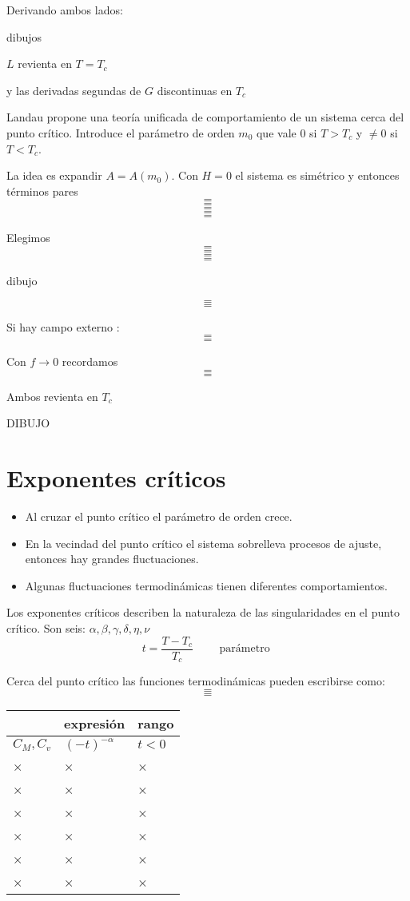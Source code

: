 \documentclass[10pt,oneside]{CBFT_book}
\begin{document}
Derivando ambos lados:

dibujos

$L$ revienta en $T=T_c$

y las derivadas segundas de $G$ discontinuas en $T_c$

Landau propone una teoría unificada de comportamiento de un sistema cerca del punto crítico.
Introduce el parámetro de orden $m_0$ que vale 0 si $T>T_c$ y $\neq 0$ si $T<T_c$.

La idea es expandir $ A = A(m_0) $.
Con $H=0$ el sistema es simétrico y entonces términos pares
\[=\]
\[=\]
\[=\]
\[=\]
\[=\]

Elegimos
\[=\]
\[=\]
\[=\]
\[=\]

dibujo

\[=\]
\[=\]

Si hay campo externo :
\[=\]
\[=\]

Con $f \to 0$ recordamos
\[=\]
\[=\]

Ambos revienta en $T_c$

DIBUJO

\section{Exponentes críticos}

\begin{itemize}
 \item Al cruzar el punto crítico el parámetro de orden crece.
 \item En la vecindad del punto crítico el sistema sobrelleva procesos de ajuste, entonces
 hay grandes fluctuaciones.
 \item Algunas fluctuaciones termodinámicas tienen diferentes comportamientos.
\end{itemize}

Los exponentes críticos describen la naturaleza de las singularidades en el punto crítico.
Son seis: $ \alpha, \beta, \gamma, \delta, \eta, \nu $
\[
	t = \frac{T-T_c}{T_c} \qquad \text{ parámetro } 
\]

Cerca del punto crítico las funciones termodinámicas pueden escribirse como:
\[=\]
\[=\]

\begin{center}
\begin{tabular}{lll}
 & expresión & rango \\
\hline
$C_M, C_v$ & $(-t)^{-\alpha}$ & $t < 0$  \\
× & × & ×\\
× & × & ×\\
× & × & ×\\
× & × & ×\\
× & × & ×\\
× & × & ×
\end{tabular}
\end{center}
\end{document}
